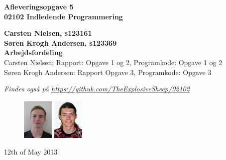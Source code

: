 \thispagestyle{empty} %
\begin{center}
\textbf{\Huge {Afleveringsopgave 5}\\ \vspace{1cm}
\huge{02102 Indledende Programmering}}
\end{center}
\vspace{1cm}
\begin{center}
\Large{\textbf{Carsten Nielsen, s123161 \\ Søren Krogh Andersen, s123369}} \\
\vspace{1cm}
\Large{\textbf{Arbejdsfordeling}} \\
Carsten Nielsen: Rapport: Opgave 1 og 2, Programkode: Opgave 1 og 2 \\
Søren Krogh Andersen: Rapport Opgave 3, Programkode: Opgave 3

\emph{Findes også på \url{https://github.com/TheExplosiveSheep/02102}}
\end{center}
\vspace{6cm}
\begin{figure}[h]
\hfill
\includegraphics{s123161.png}%
\includegraphics{s123369.png}%
\end{figure}
12th of May 2013

\thispagestyle{empty}
\newpage
